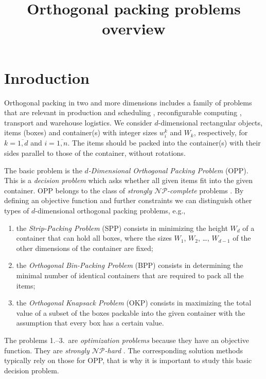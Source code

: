 \documentclass[a4paper,12pt]{article}
\begin{document}
\newcommand{\itemh}[2]{\item[{\makebox[9mm][l]{\bf{#1}}}] \textbf{#2}
\nopagebreak}

\title{Orthogonal packing problems overview}

\section{Inroduction}

Orthogonal packing in two and more dimensions includes a family of problems that are relevant in production and scheduling \cite{ESICUP,WaescherTyp,Hartmann2000}, reconfigurable computing \cite{Wiki-ReconfComp}, transport and warehouse logistics. We consider $d$-dimensional rectangular objects, items (boxes) and container(s) with integer sizes $w^k_i$ and $W_k$, respectively, for $k=\overline{1,d}$ and $i=\overline{1,n}$. The items should be packed into the container(s) with their sides parallel to those of the container, without rotations. 

The basic problem is the \emph{$d$-Dimensional Orthogonal Packing Problem} (OPP). This is a \emph{decision problem} which asks whether all given items fit into the given container. OPP belongs to the class of \emph{strongly $\mathcal{NP}$-complete} problems \cite{GJ79,FekExact}. By defining an objective function and further constraints we can distinguish other types of $d$-dimensional orthogonal packing problems, e.g.,
\begin{enumerate}
\item the \emph{Strip-Packing Problem} (SPP) consists in minimizing the height $W_d$ of a container that can hold all boxes, where the sizes $W_1$, $W_2$, \ldots, $W_{d-1}$ of the other dimensions of the container are fixed;
\item the \emph{Orthogonal Bin-Packing Problem} (BPP) consists in determining the minimal number of identical containers that are required to pack all the items; 
\item the \emph{Orthogonal Knapsack Problem} (OKP) consists in maximizing the total value of a subset of the boxes packable into the given container with the assumption that every box has a certain value.
\end{enumerate}

The problems 1.--3.\ are \emph{optimization problems} because they have an objective function. They are \emph{strongly $\mathcal{NP}$-hard} \cite{GJ79,FekExact}. The corresponding solution methods typically rely on those for OPP, that is why it is important to study this basic decision problem.
\end{document}
